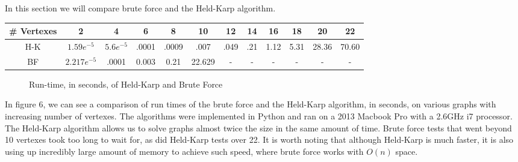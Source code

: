 \documentclass[a4paper,titlepage, margin, 11pt]{article}
\numberwithin{equation}{section}
\begin{document}
In this section we will compare brute force and the Held-Karp algorithm.

\begin{table}[h]
\centering
\begin{tabular}{c|c|c|c|c|c|c|c|c|c|c|c|}
    \# Vertexes & 2 & 4 & 6 & 8 & 10 & 12 & 14 & 16 & 18 & 20 & 22 \\\hline
    
    H-K & $1.59e^{-5}$ & $5.6e^{-5}$ & .0001 & .0009 &.007 & .049&.21 &1.12 & 5.31 & 28.36 & 70.60\\ \hline
    BF &$2.217e^{-5}$ & .0001 & 0.003 & 0.21 & 22.629 & - & - & - & - & - & - \\\hline
  \end{tabular}
\end{table}

\begin{figure}[h!]
\caption{Run-time, in seconds, of Held-Karp and Brute Force}
\end{figure}

In figure 6, we can see a comparison of run times of the brute force and the Held-Karp algorithm, in seconds, on various graphs with increasing number of vertexes. The algorithms were implemented in Python and ran on a 2013 Macbook Pro with a 2.6GHz i7 processor. The Held-Karp algorithm allows us to solve graphs almost twice the size in the same amount of time. Brute force tests that went beyond 10 vertexes took too long to wait for, as did Held-Karp tests over 22. 
It is worth noting that although Held-Karp is much faster, it is also using up incredibly large amount of memory to achieve such speed, where brute force works with $O(n)$ space.
\newpage
\end{document}
